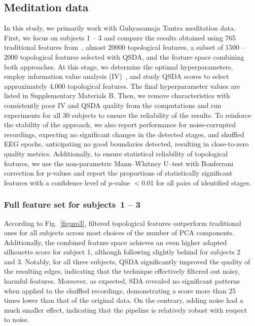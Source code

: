 \documentclass[pdflatex,sn-basic,Numbered]{sn-jnl}
\begin{document}
\subsection{Meditation data}

In this study, we primarily work with Guhyasamaja Tantra meditation data. First, we focus on subjects 1 -- 3 and compare the results obtained using 765 traditional features from~\cite{SDA}, almost 20000 topological features, a subset of 1500 -- 2000 topological features selected with QSDA, and the feature space combining both approaches. At this stage, we determine the optimal hyperparameters, employ information value analysis (IV)~\cite{InformationValue}, and study QSDA scores to select approximately 4,000 topological features. The final hyperparameter values are listed in Supplementary Materials B. Then, we remove characteristics with consistently poor IV and QSDA quality from the computations and run experiments for all 30 subjects to ensure the reliability of the results. To reinforce the stability of the approach, we also report performance for noise-corrupted recordings, expecting no significant changes in the detected stages, and shuffled EEG epochs, anticipating no good boundaries detected, resulting in close-to-zero quality metrics. Additionally, to ensure statistical reliability of topological features, we use the non-parametric Mann--Whitney U--test with Bonferroni correction for p-values and report the proportions of statistically significant features with a confidence level of p-value $< 0.01$ for all pairs of identified stages.

\subsubsection{Full feature set for subjects~1 -- 3}

According to Fig.~\ref{figure3}, filtered topological features outperform traditional ones for all subjects across most choices of the number of PCA components. Additionally, the combined feature space achieves an even higher adapted silhouette score for subject 1, although following slightly behind for subjects 2 and 3. Notably, for all three subjects, QSDA significantly improved the quality of the resulting edges, indicating that the technique effectively filtered out noisy, harmful features. Moreover, as expected, SDA revealed no significant patterns when applied to the shuffled recordings, demonstrating a score more than 25 times lower than that of the original data. On the contrary, adding noise had a much smaller effect, indicating that the pipeline is relatively robust with respect to noise.
\end{document}
